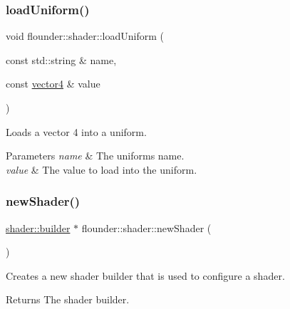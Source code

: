 \subsubsection{\texorpdfstring{load\+Uniform()}{loadUniform()}\hspace{0.1cm}{\footnotesize\ttfamily [13/13]}}
{\footnotesize\ttfamily void flounder\+::shader\+::load\+Uniform (\begin{DoxyParamCaption}\item[{const std\+::string \&}]{name,  }\item[{const \hyperlink{classflounder_1_1vector4}{vector4} \&}]{value }\end{DoxyParamCaption})}



Loads a vector 4 into a uniform. 


\begin{DoxyParams}{Parameters}
{\em name} & The uniforms name. \\
\hline
{\em value} & The value to load into the uniform. \\
\hline
\end{DoxyParams}
\mbox{\label{classflounder_1_1shader_a3dbe598a9994e8e4ccbf889ba38b05f7}} 
\subsubsection{\texorpdfstring{new\+Shader()}{newShader()}}
{\footnotesize\ttfamily \hyperlink{classflounder_1_1shader_1_1builder}{shader\+::builder} $\ast$ flounder\+::shader\+::new\+Shader (\begin{DoxyParamCaption}{ }\end{DoxyParamCaption})\hspace{0.3cm}{\ttfamily [static]}}



Creates a new shader builder that is used to configure a shader. 

\begin{DoxyReturn}{Returns}
The shader builder. 
\end{DoxyReturn}
\mbox{\label{classflounder_1_1shader_ad80001da433e7afbd646fe2d19ac8b4a}} 
